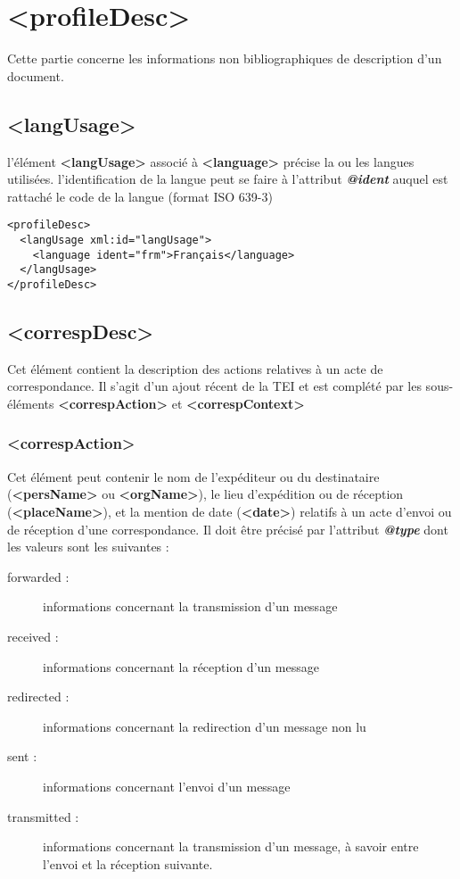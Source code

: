 \documentclass[18pt,a4paper,oneside]{book} %
\begin{document}
\section{<profileDesc>}

Cette partie concerne les informations non bibliographiques de description d'un document.

\subsection{<langUsage>}
l'élément \textbf{<langUsage>} associé à \textbf{<language>} précise la ou les langues utilisées.
l'identification de la langue peut se faire à l'attribut \textbf{\textit{@ident}} auquel est rattaché le code de la langue (format ISO 639-3)
\begin{lstlisting}
<profileDesc>
  <langUsage xml:id="langUsage">
    <language ident="frm">Français</language>
  </langUsage>
</profileDesc>
\end{lstlisting}

\subsection{<correspDesc>}
Cet élément contient la description des actions relatives à un acte de correspondance.  Il s'agit d'un ajout récent de la TEI et est complété par les sous-éléments \textbf{<correspAction>} et \textbf{<correspContext>}

\subsubsection{<correspAction>}
Cet élément peut contenir le nom de l'expéditeur ou du destinataire  (\textbf{<persName>} ou \textbf{<orgName>}), le lieu d'expédition ou de réception (\textbf{<placeName>}), et la mention de date (\textbf{<date>}) relatifs à un acte d'envoi ou de réception d'une correspondance. Il doit être précisé par l'attribut \textbf{\textit{@type}} dont les valeurs sont les suivantes : 
\bigskip 

\begin{description}
\item [forwarded : ]informations concernant la transmission d'un message
\item [received : ]informations concernant la réception d'un message
\item [redirected : ]informations concernant la redirection d'un message non lu
\item [sent : ]informations concernant l'envoi d'un message
\item [transmitted : ]informations concernant la transmission d'un message, à savoir entre l'envoi et la réception suivante.
\end{description}
\bigskip 
\end{document}
